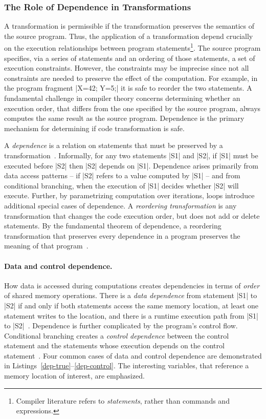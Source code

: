 \subsubsection{The Role of Dependence in Transformations}
\label{dependence-analysis}

A transformation is permissible if the transformation preserves the semantics of the source program.
Thus, the application of a transformation depend crucially on the execution {relationships} between program statements\footnote{
Compiler literature refers to \emph{statements}, rather than commands and expressions.}.
The source program specifies,  via a series of statements and an ordering of those statements, a set of {execution constraints}.
However, the constraints may be imprecise since not all constraints are needed to preserve the effect of the computation.
For example, in the program fragment \pr|X=42; Y=5;| it is safe to reorder the two statements.
A fundamental challenge in compiler theory concerns determining whether an execution order, that differs from the one specified by the source program,
always computes the same result as the source program.
Dependence is the primary mechanism for determining if code transformation is safe.

A \emph{dependence} is a relation on statements that must be preserved by a transformation~\cite[p. 47]{kennedy2001}.
Informally, for any two statements \pr|S1| and \pr|S2|, if \pr|S1| must be executed before \pr|S2| then \pr|S2| depends on \pr|S1|.
Dependence arises primarily from data access patterns -- if \pr|S2| refers to a value computed by \pr|S1| -- and from conditional branching, when the execution of \pr|S1| decides whether \pr|S2| will execute.
Further, by parametrizing computation over iterations, loops introduce additional special cases of dependence.
A \emph{reordering transformation} is any transformation that changes the code execution order, but does not add or delete statements.
By the fundamental theorem of dependence, a reordering transformation that preserves every dependence in a program preserves the meaning of that program~\cite[p. 66]{kennedy2001}.

\paragraph*{Data and control dependence.}
How data is accessed during computations creates dependencies in terms of \emph{order} of shared memory operations.
There is a \emph{data dependence} from statement \pr|S1| to \pr|S2|
if and only if both statements access the same memory location, at least one statement writes to the location,
and there is a runtime execution path from \pr|S1| to \pr|S2|~\cite[p. 59-60]{kennedy2001}.
Dependence is further complicated by the program's control flow.
Conditional branching creates a \emph{control dependence} between the control statement
and the statements whose execution depends on the control statement~\cite[p. 374]{kennedy2001}.
Four common cases of data and control dependence are demonstrated in Listings~\ref{dep-true}--\ref{dep-control}.
The interesting variables, that reference a memory location of interest, are emphasized.

